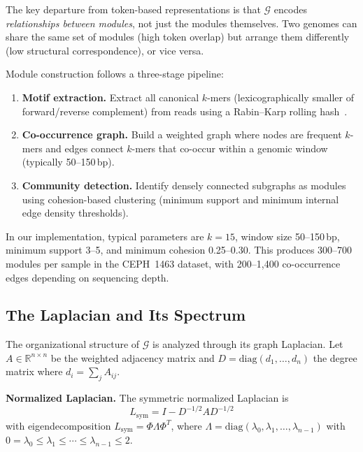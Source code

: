 \documentclass{../yalumba}
\begin{document}
The key departure from token-based representations is that $\mathcal{G}$
encodes \emph{relationships between modules}, not just the modules
themselves.  Two genomes can share the same set of modules (high token
overlap) but arrange them differently (low structural correspondence),
or vice versa.

Module construction follows a three-stage pipeline:

\begin{enumerate}
  \item \textbf{Motif extraction.}  Extract all canonical $k$-mers
    (lexicographically smaller of forward/reverse complement) from reads
    using a Rabin--Karp rolling hash~\cite{karp1987rabin}.
  \item \textbf{Co-occurrence graph.}  Build a weighted graph where
    nodes are frequent $k$-mers and edges connect $k$-mers that
    co-occur within a genomic window (typically 50--150\,bp).
  \item \textbf{Community detection.}  Identify densely connected
    subgraphs as modules using cohesion-based clustering (minimum support
    and minimum internal edge density thresholds).
\end{enumerate}

In our implementation, typical parameters are $k = 15$, window size
50--150\,bp, minimum support 3--5, and minimum cohesion 0.25--0.30.
This produces 300--700 modules per sample in the CEPH~1463 dataset,
with 200--1{,}400 co-occurrence edges depending on sequencing depth.

\subsection{The Laplacian and Its Spectrum}
\label{sec:framework:laplacian}

The organizational structure of $\mathcal{G}$ is analyzed through its
graph Laplacian.  Let $A \in \mathbb{R}^{n \times n}$ be the weighted
adjacency matrix and $D = \mathrm{diag}(d_1, \ldots, d_n)$ the degree
matrix where $d_i = \sum_j A_{ij}$.

\begin{definition}
\textbf{Normalized Laplacian.}  The symmetric normalized Laplacian is
\begin{equation}
  L_{\mathrm{sym}} = I - D^{-1/2} A D^{-1/2}
  \label{eq:laplacian}
\end{equation}
with eigendecomposition $L_{\mathrm{sym}} = \Phi \Lambda \Phi^T$, where
$\Lambda = \mathrm{diag}(\lambda_0, \lambda_1, \ldots, \lambda_{n-1})$
with $0 = \lambda_0 \leq \lambda_1 \leq \cdots \leq \lambda_{n-1}
\leq 2$.
\end{definition}
\end{document}

